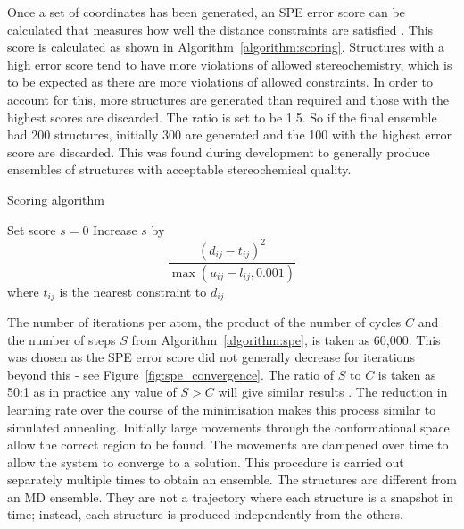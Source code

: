 Once a set of coordinates has been generated, an SPE error score can be calculated that measures how well the distance constraints are satisfied \cite{Agrafiotis2013}.
This score is calculated as shown in Algorithm~\ref{algorithm:scoring}.
Structures with a high error score tend to have more violations of allowed stereochemistry, which is to be expected as there are more violations of allowed constraints.
In order to account for this, more structures are generated than required and those with the highest scores are discarded.
The ratio is set to be 1.5.
So if the final ensemble had 200 structures, initially 300 are generated and the 100 with the highest error score are discarded.
This was found during development to generally produce ensembles of structures with acceptable stereochemical quality.


\begin{algorithm}[p]
\caption{Scoring algorithm}
\label{algorithm:scoring}
\begin{algorithmic}

\State Set score $s = 0$
        \State Increase $s$ by
        $$
        \frac{(d_{ij} - t_{ij})^{2}}{\max \left ( u_{ij} - l_{ij}, 0.001 \right )}
        $$
        \State where $t_{ij}$ is the nearest constraint to $d_{ij}$
    \EndIf
\EndFor

\end{algorithmic}
\end{algorithm}


The number of iterations per atom, the product of the number of cycles $C$ and the number of steps $S$ from Algorithm~\ref{algorithm:spe}, is taken as 60,000.
This was chosen as the SPE error score did not generally decrease for iterations beyond this - see Figure~\ref{fig:spe_convergence}.
The ratio of $S$ to $C$ is taken as 50:1 as in practice any value of $S > C$ will give similar results \cite{Agrafiotis2013}.
The reduction in learning rate over the course of the minimisation makes this process similar to simulated annealing.
Initially large movements through the conformational space allow the correct region to be found.
The movements are dampened over time to allow the system to converge to a solution.
This procedure is carried out separately multiple times to obtain an ensemble.
The structures are different from an MD ensemble.
They are not a trajectory where each structure is a snapshot in time; instead, each structure is produced independently from the others.


